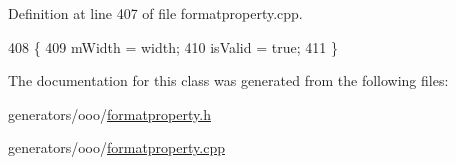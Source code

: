Definition at line 407 of file formatproperty.\+cpp.


\begin{DoxyCode}
408 \{
409   mWidth = width;
410   isValid = \textcolor{keyword}{true};
411 \}
\end{DoxyCode}


The documentation for this class was generated from the following files\+:\begin{DoxyCompactItemize}
\item 
generators/ooo/\hyperlink{formatproperty_8h}{formatproperty.\+h}\item 
generators/ooo/\hyperlink{formatproperty_8cpp}{formatproperty.\+cpp}\end{DoxyCompactItemize}
